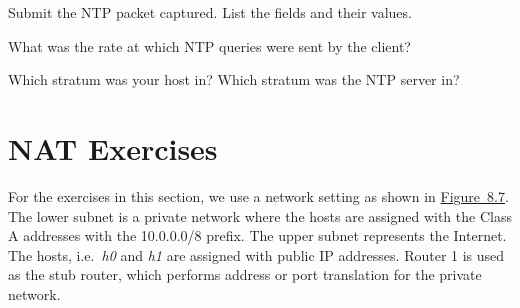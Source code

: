 \documentclass{../UTNetLab}
\begin{document}
    \begin{report}
    \item Submit the NTP packet captured.
    List the fields and their values.
    
    \item What was the rate at which NTP queries were sent by the client?
    
    \item Which stratum was your host in? Which stratum was the NTP server in?
    \end{report}

\part{NAT Exercises}
    For the exercises in this section, we use a network setting as shown in \hyperref[fig:8.7]{Figure~8.7}.
    The lower subnet is a private network where the hosts are assigned with the Class A addresses with the 10.0.0.0/8 prefix.
    The upper subnet represents the Internet.
    The hosts, i.e.\  \textit{h0} and \textit{h1} are assigned with public IP addresses.
    Router 1 is used as the stub router, which performs address or port translation for the private network.
\end{document}
